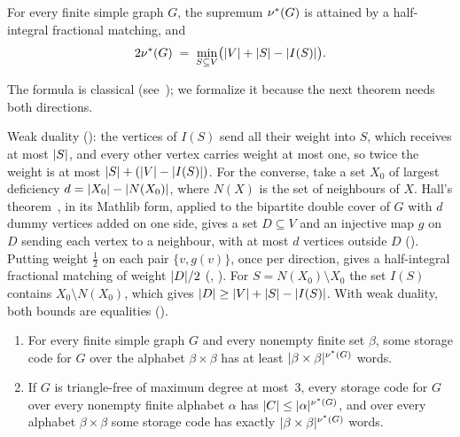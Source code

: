 \begin{proposition}\label{prop:fracTB}
For every finite simple graph $G$, the supremum $\nu^{*}(G)$ is attained by a half-integral fractional matching, and
\[
  2\nu^{*}(G)\;=\;\min_{S\subseteq V}\bigl(\lvert V \rvert+\lvert S \rvert-\lvert I(S) \rvert\bigr).
\]
\end{proposition}

The formula is classical (see~\cite{ScheinermanUllman1997}); we formalize it because the next theorem needs both
directions.

\begin{outline}
Weak duality (): the vertices of $I(S)$ send all their weight into $S$, which receives at most
$\lvert S \rvert$, and every other vertex carries weight at most one, so twice the weight is at most
$\lvert S \rvert+(\lvert V \rvert-\lvert I(S) \rvert)$. For the converse, take a set $X_0$ of largest deficiency $d=\lvert X_0 \rvert-\lvert N(X_0) \rvert$,
where $N(X)$ is the set of neighbours of $X$. Hall's theorem~\cite{Hall1935}, in its Mathlib form, applied to the
bipartite double cover of $G$ with $d$ dummy vertices added on one side, gives a set $D\subseteq V$ and an injective map
$g$ on $D$ sending each vertex to a neighbour, with at most $d$ vertices outside $D$
(). Putting weight $\frac12$ on each pair $\{v,g(v)\}$, once per direction, gives a
half-integral fractional matching of weight $\lvert D \rvert/2$ (, ). For
$S=N(X_0)\setminus X_0$ the set $I(S)$ contains $X_0\setminus N(X_0)$, which gives
$\lvert D \rvert\ge\lvert V \rvert+\lvert S \rvert-\lvert I(S) \rvert$. With weak duality, both bounds are equalities ().
\end{outline}

\begin{theorem}\label{thm:gn}
\begin{enumerate}[label=(\alph*)]
\item\label{it:gn-lower} For every finite simple graph $G$ and every nonempty finite set $\beta$, some storage code for
$G$ over the alphabet $\beta\times\beta$ has at least $\lvert \beta\times\beta \rvert^{\nu^{*}(G)}$ words.
\item\label{it:gn-upper} If $G$ is triangle-free of maximum degree at most~$3$, every storage code for $G$ over every
nonempty finite alphabet $\alpha$ has $\lvert C \rvert\le\lvert \alpha \rvert^{\nu^{*}(G)}$, and over every alphabet $\beta\times\beta$
some storage code has exactly $\lvert \beta\times\beta \rvert^{\nu^{*}(G)}$ words.
\end{enumerate}
\end{theorem}

